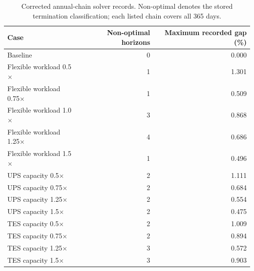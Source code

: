 \begin{table}[htbp]
\centering\small
\caption{Corrected annual-chain solver records. Non-optimal denotes the stored termination classification; each listed chain covers all 365 days.}\label{tab:solver-quality}
\begin{tabular}{@{}lrr@{}}\toprule
Case & Non-optimal horizons & Maximum recorded gap (\%) \\\midrule
Baseline & 0 & 0.000 \\
Flexible workload 0.5$\times$ & 1 & 1.301 \\
Flexible workload 0.75$\times$ & 1 & 0.509 \\
Flexible workload 1.0$\times$ & 3 & 0.868 \\
Flexible workload 1.25$\times$ & 4 & 0.686 \\
Flexible workload 1.5$\times$ & 1 & 0.496 \\
UPS capacity 0.5$\times$ & 2 & 1.111 \\
UPS capacity 0.75$\times$ & 2 & 0.684 \\
UPS capacity 1.25$\times$ & 2 & 0.554 \\
UPS capacity 1.5$\times$ & 2 & 0.475 \\
TES capacity 0.5$\times$ & 2 & 1.009 \\
TES capacity 0.75$\times$ & 2 & 0.894 \\
TES capacity 1.25$\times$ & 3 & 0.572 \\
TES capacity 1.5$\times$ & 3 & 0.903 \\
\bottomrule\end{tabular}
\end{table}
